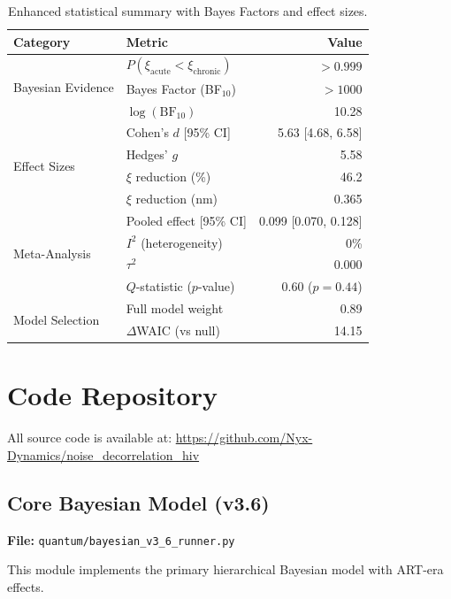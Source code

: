\documentclass[11pt]{article}
\begin{document}
\begin{table}[h]
\centering
\caption{Enhanced statistical summary with Bayes Factors and effect sizes.}
\begin{tabular}{llr}
\toprule
\textbf{Category} & \textbf{Metric} & \textbf{Value} \\
\midrule
\multirow{3}{*}{Bayesian Evidence}
& $P(\xi_\text{acute} < \xi_\text{chronic})$ & $>0.999$ \\
& Bayes Factor (BF$_{10}$) & $>1000$ \\
& $\log(\text{BF}_{10})$ & 10.28 \\
\midrule
\multirow{4}{*}{Effect Sizes}
& Cohen's $d$ [95\% CI] & 5.63 [4.68, 6.58] \\
& Hedges' $g$ & 5.58 \\
& $\xi$ reduction (\%) & 46.2 \\
& $\xi$ reduction (nm) & 0.365 \\
\midrule
\multirow{4}{*}{Meta-Analysis}
& Pooled effect [95\% CI] & 0.099 [0.070, 0.128] \\
& $I^2$ (heterogeneity) & 0\% \\
& $\tau^2$ & 0.000 \\
& $Q$-statistic ($p$-value) & 0.60 ($p = 0.44$) \\
\midrule
\multirow{2}{*}{Model Selection}
& Full model weight & 0.89 \\
& $\Delta$WAIC (vs null) & 14.15 \\
\bottomrule
\end{tabular}
\end{table}

\newpage
\section{Code Repository}
\label{sec:code}

All source code is available at: \url{https://github.com/Nyx-Dynamics/noise_decorrelation_hiv}

\subsection{Core Bayesian Model (v3.6)}

\textbf{File:} \texttt{quantum/bayesian\_v3\_6\_runner.py}

This module implements the primary hierarchical Bayesian model with ART-era effects.
\end{document}
